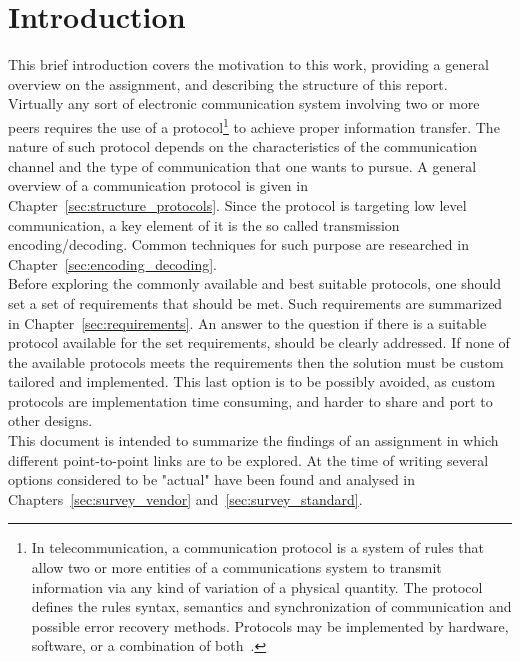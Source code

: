 \section{Introduction}
\label{sec:introduction}

This brief introduction covers the motivation to this work, providing a general overview on the assignment, and describing the structure of this report.\\

Virtually any sort of electronic communication system involving two or more peers requires the use of a protocol\footnote{In telecommunication, a communication protocol is a system of rules that allow two or more entities of a communications system to transmit information via any kind of variation of a physical quantity. The protocol defines the rules syntax, semantics and synchronization of communication and possible error recovery methods. Protocols may be implemented by hardware, software, or a combination of both~\cite{Wikipedia_protocol}.} to achieve proper information transfer. The nature of such protocol depends on the characteristics of the communication channel and the type of communication that one wants to pursue. A general overview of a communication protocol is given in Chapter~\ref{sec:structure_protocols}. Since the protocol is targeting low level communication, a key element of it is the so called transmission encoding/decoding. Common techniques for such purpose are researched in Chapter~\ref{sec:encoding_decoding}.\\

Before exploring the commonly available and best suitable protocols, one should set a set of requirements that should be met. Such requirements are summarized in Chapter~\ref{sec:requirements}. An answer to the question if there is a suitable protocol available for the set requirements, should be clearly addressed. If none of the available protocols meets the requirements then the solution must be custom tailored and implemented. This last option is to be possibly avoided, as custom protocols are implementation time consuming, and harder to share and port to other designs.\\

This document is intended to summarize the findings of an assignment in which different point-to-point links are to be explored. At the time of writing several options considered to be "actual" have been found and analysed in Chapters~\ref{sec:survey_vendor} and~\ref{sec:survey_standard}.\\

